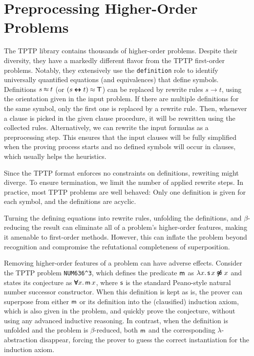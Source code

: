 \documentclass[smallcondensed,draft]{svjour3}     %
\begin{document}
\section{Preprocessing Higher-Order Problems}
\label{sec:satfol:ho-tech:preprocessing}

The TPTP library contains thousands of higher-order problems. Despite their
diversity, they have a markedly different flavor from the TPTP first-order
problems. Notably, they extensively use the \verb|definition| role to identify
universally quantified equations (and equivalences) that define symbols.
%
Definitions $s \mathbin{\approx} t$ (or $(s \pmb\leftrightarrow t) \mathbin{\approx} \pmb\top$) can be replaced by rewrite
rules $s \rightarrow t$,
using the orientation given in the input problem. If there are multiple
definitions for the same symbol, only the first one is replaced by a rewrite rule.
Then, whenever a clause is picked in the given clause procedure, it will be rewritten
using the collected rules.
Alternatively, we can rewrite
the input formulas as a preprocessing step. This ensures that the input
clauses will be fully simplified when the proving process starts and no
defined symbols will occur in clauses, which usually helps the heuristics.

Since the TPTP format enforces no constraints on
definitions, rewriting might diverge. To ensure
termination, we limit the number of applied rewrite steps. In
practice, most TPTP problems are well behaved: Only one
definition is given for each symbol, and the definitions are acyclic.

Turning the defining equations into rewrite rules, unfolding the definitions, and
$\beta$-reduc\-ing the result can eliminate all of a problem's higher-order features, making
it amenable to first-order methods. However, this can inflate the problem
beyond recognition and compromise the refutational completeness of
superposition.

\begin{exa} 
  Removing higher-order features of a problem can have adverse effects.
  Consider the TPTP problem \texttt{NUM636\^{}3}, which defines the predicate ${\mathsf{m}}$
  as $\lambda x.\, {\mathsf{s}} \, x \pmb{\not\approx} x$ and states its conjecture as $\pmb\forall
  x.\, {\mathsf{m}} \, x $, where ${\mathsf{s}}$ is the standard Peano-style natural number
  successor constructor. When this definition is kept as is, the
  prover can superpose from either ${\mathsf{m}}$ or its definition into the
  (clausified) induction axiom, which is also given in the problem, and quickly prove
  the conjecture, without using any advanced inductive reasoning. In contrast,
  when the definition is
  unfolded and the problem is $\beta$-reduced, both ${\mathsf{m}}$ and the
  corresponding $\lambda$-abstraction disappear, forcing the prover to guess the
  correct instantiation for the induction axiom.
\end{exa}
\end{document}
